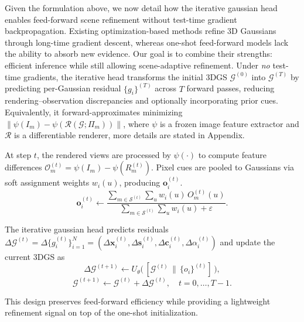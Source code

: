 Given the formulation above, we now detail how the iterative gaussian head enables
feed-forward scene refinement without test-time gradient backpropagation.
Existing optimization-based methods refine 3D Gaussians through long-time gradient
descent, whereas one-shot feed-forward models lack the ability to absorb new
evidence. Our goal is to combine their strengths: efficient inference while still allowing scene-adaptive refinement.
Under \emph{no} test-time gradients, the iterative head transforms the initial
3DGS $\mathcal{G}^{(0)}$ into $\mathcal{G}^{(T)}$ by predicting per-Gaussian residual $\{g_i\}^{(T)}$ across $T$ forward passes, reducing rendering–observation discrepancies and optionally incorporating prior cues. Equivalently, it forward-approximates minimizing
$\|\psi(I_m)-\psi(\mathcal{R}(\mathcal{G};\Pi_m))\|$, where $\psi$ is a
frozen image feature extractor and $\mathcal{R}$ is a differentiable renderer, more details are stated in Appendix.

At step $t$, the rendered views are processed by $\psi(\cdot)$ to compute feature differences $\mathcal{O}_m^{(t)}=\psi(I_m)-\psi(R_m^{(t)})$. Pixel cues are pooled to Gaussians via soft assignment weights $w_i(u)$, producing $\mathbf{o}_i^{(t)}$. 
\begin{equation}
\mathbf{o}_i^{(t)} \leftarrow
\frac{\sum_{m\in\mathcal{S}^{(t)}}\sum_{u} w_i(u)\,O_m^{(t)}(u)}
     {\sum_{m\in\mathcal{S}^{(t)}}\sum_{u} w_i(u)+\varepsilon}.
\end{equation}

The iterative gaussian head predicts residuals
$\Delta \mathcal{G}^{(t)} = \Delta \{g_i^{(t)}\}_{i=1}^{N}=(\Delta\mathbf{x}_i^{(t)},\Delta\mathbf{s}_i^{(t)},
\Delta\mathbf{c}_i^{(t)},\Delta\alpha_i^{(t)})$ and update the current 3DGS as
\begin{equation}
    \Delta \mathcal{G}^{(t+1)} \leftarrow U_\theta\big(\,[\mathcal{G}^{(t)} \,\|\, \{o_i\}^{(t)}]\,\big),
\end{equation}
\begin{equation}
    \mathcal{G}^{(t+1)} \leftarrow \mathcal{G}^{(t)}+\Delta \mathcal{G}^{(t)},\quad t=0,\dots,T-1.
\end{equation}

This design preserves feed-forward efficiency while providing a lightweight refinement signal on top of the one-shot initialization.

